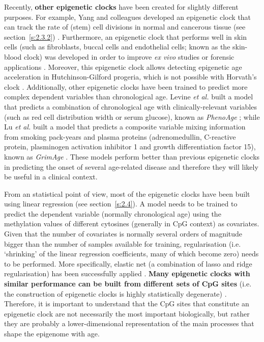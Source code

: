 Recently, \textbf{other epigenetic clocks} have been created for slightly different purposes. For example, Yang and colleagues developed an epigenetic clock that can track the rate of (stem) cell divisions in normal and cancerous tissue (see section~\ref{s:2.3.2}) \cite{Yang2016}. Furthermore, an epigenetic clock that performs well in skin cells (such as fibroblasts, buccal cells and endothelial cells; known as the skin-blood clock) was developed in order to improve \textit{ex vivo} studies or forensic applications \cite{Horvath2018a}. Moreover, this epigenetic clock allows detecting epigenetic age acceleration in Hutchinson-Gilford progeria, which is not possible with Horvath's clock \cite{Horvath2018a}. Additionally, other epigenetic clocks have been trained to predict more complex dependent variables than chronological age. Levine \textit{et al.} built a model that predicts a combination of chronological age with clinically-relevant variables (such as red cell distribution width or serum glucose), known as \textit{PhenoAge} \cite{Levine2018}; while Lu \textit{et al.} built a model that predicts a composite variable mixing information from smoking pack-years and plasma proteins (adrenomedullin, C-reactive protein, plasminogen activation inhibitor 1 and growth differentiation factor 15), known as \textit{GrimAge} \cite{Lu2019}. These models perform better than previous epigenetic clocks in predicting the onset of several age-related disease and therefore they will likely be useful in a clinical context.    

\bigskip

From an statistical point of view, most of the epigenetic clocks have been built using linear regression (see section~\ref{s:2.4}). A model needs to be trained to predict the dependent variable (normally chronological age) using the methylation values of different cytosines (generally in CpG context) as covariates. Given that the number of covariates is normally several orders of magnitude bigger than the number of samples available for training, regularisation (i.e. `shrinking' of the linear regression coefficients, many of which become zero) needs to be performed. More specifically, elastic net (a combination of lasso and ridge regularisation) has been successfully applied \cite{Friedman2010}. \textbf{Many epigenetic clocks with similar performance can be built from different sets of CpG sites} (i.e. the construction of epigenetic clocks is highly statistically degenerate) \cite{Thompson2018}. Therefore, it is important to understand that the CpG sites that constitute an epigenetic clock are not necessarily the most important biologically, but rather they are probably a lower-dimensional representation of the main processes that shape the epigenome with age.


